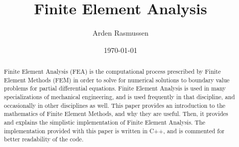 \documentclass[10pt]{amsart}
\title{Finite Element Analysis}
\author{Arden Rasmussen}
\date{\today}
\theoremstyle{definition}
\begin{document}
\maketitle

\begin{abstract}
  Finite Element Analysis (FEA) is the computational process prescribed by
  Finite Element Methods (FEM) in order to solve for numerical solutions to
  boundary value problems for partial differential equations. Finite Element
  Analysis is used in many specializations of mechanical engineering, and is
  used frequently in that discipline, and occasionally in other disciplines as
  well. This paper provides an introduction to the mathematics of Finite
  Element Methods, and why they are useful. Then, it provides and explains the
  simplistic implementation of Finite Element Analysis. The implementation
  provided with this paper is written in C++, and is commented for better
  readability of the code.
\end{abstract}

\begin{multicols}{2}
  
  
  

  \nocite{*}
  
  
\end{multicols}
\end{document}

